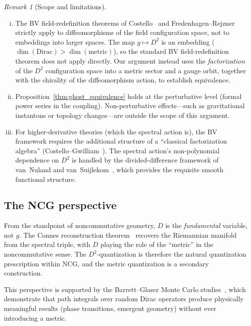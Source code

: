 \documentclass[12pt,a4paper]{article}
\theoremstyle{definition}
\theoremstyle{remark}
\newtheorem{remark}[theorem]{Remark}
\begin{document}
\begin{remark}[Scope and limitations]
\label{rem:scope}
\mbox{}
\begin{enumerate}[(i)]
  \item The BV field-redefinition theorems of
    Costello~\cite{Costello:2011book} and
    Fredenhagen--Rejzner~\cite{Fredenhagen:2011bv} strictly apply to
    diffeomorphisms of the field configuration space, not to embeddings
    into larger spaces.  The map $g \mapsto D^2$ is an embedding
    ($\dim(\mathrm{Dirac}) > \dim(\mathrm{metric})$), so the standard
    BV field-redefinition theorem does not apply directly.  Our argument
    instead uses the \emph{factorization} of the $D^2$ configuration
    space into a metric sector and a gauge orbit, together with the
    chirality of the diffeomorphism action, to establish equivalence.
  \item Proposition~\ref{thm:ghost_equivalence} holds at the perturbative
    level (formal power series in the coupling).  Non-perturbative
    effects---such as gravitational instantons or topology
    changes---are outside the scope of this argument.
  \item For higher-derivative theories (which the spectral action is),
    the BV framework requires the additional structure of a
    ``classical factorization algebra''
    (Costello--Gwilliam~\cite{Costello:2017fact1, Costello:2021fact2}).
    The spectral action's non-polynomial dependence on $D^2$ is handled
    by the divided-difference framework of van~Nuland and
    van~Suijlekom~\cite{vanNuland:2021oneloop}, which provides the
    requisite smooth functional structure.
\end{enumerate}
\end{remark}

\subsection{The NCG perspective}

From the standpoint of noncommutative geometry, $D$ is the \emph{fundamental}
variable, not $g$.  The Connes reconstruction
theorem~\cite{Connes:2008vs} recovers the Riemannian manifold from the
spectral triple, with $D$ playing the role of the ``metric'' in the
noncommutative sense.  The $D^2$-quantization is therefore the natural
quantization prescription within NCG, and the metric quantization is a
secondary construction.

This perspective is supported by the Barrett--Glaser Monte
Carlo studies~\cite{Barrett:2016monte}, which demonstrate that path integrals
over random Dirac operators produce physically meaningful results (phase
transitions, emergent geometry) without ever introducing a metric.
\end{document}
